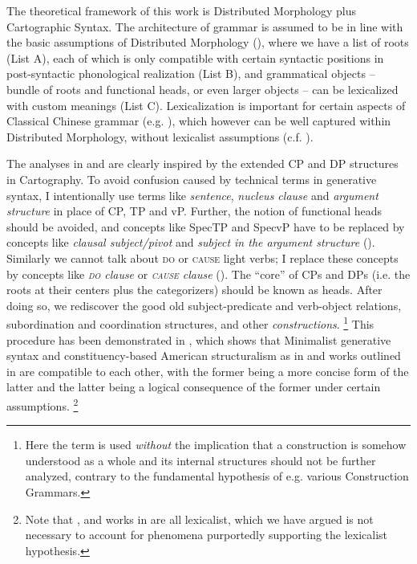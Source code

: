 \documentclass[UTF8, a4paper, oneside, scheme=plain, 12pt]{ctexrep}
\newcommand*{\term}[1]{\emph{#1}}
\newcommand*{\category}[1]{\textsc{#1}}
\begin{document}
{\small
The theoretical framework of this work is Distributed Morphology plus Cartographic Syntax.
The architecture of grammar is assumed to be in line with the basic assumptions of Distributed Morphology (),
where we have a list of roots (List A),
each of which is only compatible with certain syntactic positions in post-syntactic phonological realization (List B),
and grammatical objects -- bundle of roots and functional heads, or even larger objects -- can be lexicalized with custom meanings (List C).
Lexicalization is important for certain aspects of Classical Chinese grammar (e.g. ),
which however can be well captured within Distributed Morphology,
without lexicalist assumptions (c.f. \citealt{bruening2018lexicalist}).

The analyses in  and  are clearly inspired by the extended CP and DP structures in Cartography.
To avoid confusion caused by technical terms in generative syntax,
I intentionally use terms like \term{sentence}, \term{nucleus clause} and \term{argument structure} in place of CP, TP and vP.
Further, the notion of functional heads should be avoided, and concepts like SpecTP and SpecvP have to be replaced by concepts like \term{clausal subject/pivot} and \term{subject in the argument structure} ().
Similarly we cannot talk about \category{do} or \category{cause} light verbs;
I replace these concepts by concepts like \term{\category{do} clause} or \term{\category{cause} clause} ().
The ``core'' of CPs and DPs (i.e. the roots at their centers plus the categorizers) should be known as heads. 
After doing so, we rediscover the good old subject-predicate and verb-object relations,
subordination and coordination structures, and other \term{constructions}.%
\footnote{
    Here the term is used \emph{without} the implication 
    that a construction is somehow understood as a whole 
    and its internal structures should not be further analyzed,
    contrary to the fundamental hypothesis of e.g. various Construction Grammars.
}
This procedure has been demonstrated in \citep{deng2010},
which shows that Minimalist generative syntax and constituency-based American structuralism as in \citet{cgel} and works outlined in  are compatible to each other,
with the former being a more concise form of the latter 
and the latter being a logical consequence of the former under certain assumptions.%
\footnote{
    Note that \citet{deng2010}, \citet{cgel} and works in  are all lexicalist, which we have argued is not necessary to account for phenomena purportedly supporting the lexicalist hypothesis.
} 

}
\end{document}
